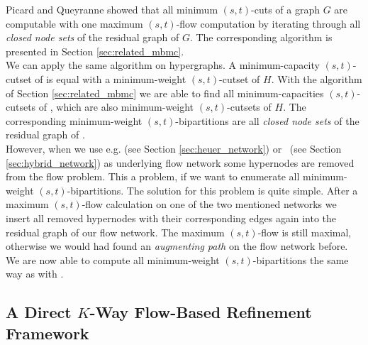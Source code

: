 Picard and Queyranne \cite{picard1980structure} showed that all minimum $(s,t)$-cuts 
of a graph $G$ are computable with one maximum $(s,t)$-flow computation by 
iterating through all \emph{closed node sets} of the residual graph of $G$. 
The corresponding algorithm is presented in Section \ref{sec:related_mbmc}. \\
We can apply the same algorithm on hypergraphs. A minimum-capacity $(s,t)$-cutset of 
is equal with a minimum-weight $(s,t)$-cutset of $H$. With the algorithm
of Section \ref{sec:related_mbmc} we are able to find all minimum-capacities
$(s,t)$-cutsets of , which are also minimum-weight $(s,t)$-cutsets
of $H$. The corresponding minimum-weight $(s,t)$-bipartitions are all
\emph{closed node sets} of the residual graph of . \\
However, when we use e.g.  (see Section \ref{sec:heuer_network})
or \ShortHybrid~(see Section \ref{sec:hybrid_network}) as underlying flow network
some hypernodes are removed from the flow problem. This a problem, if we want to
enumerate all minimum-weight $(s,t)$-bipartitions. The solution for 
this problem is quite simple. After a maximum $(s,t)$-flow calculation
on one of the two mentioned networks we insert all removed hypernodes with
their corresponding edges again into the residual graph of our flow network.
The maximum $(s,t)$-flow is still maximal, otherwise we would had found an \emph{augmenting
path} on the flow network before. We are now able to compute all minimum-weight
$(s,t)$-bipartitions the same way as with .

\subsection{A Direct $K$-Way Flow-Based Refinement Framework}
\label{sec:flow_local_search_hypergraph}

